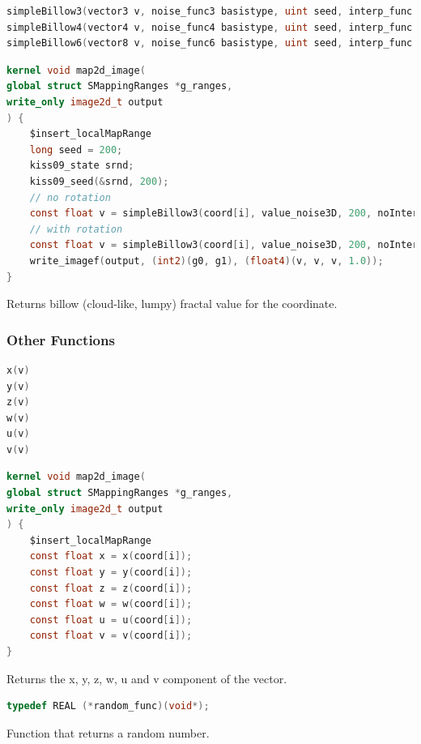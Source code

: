 \begin{lstlisting}[caption={Definition of simple billow fractal functions},label={lst:simple_billow_definition},language=OpenCL]
simpleBillow3(vector3 v, noise_func3 basistype, uint seed, interp_func interp, random_func rnd, void *srnd, uint numoctaves, REAL frequency, bool rot);
simpleBillow4(vector4 v, noise_func4 basistype, uint seed, interp_func interp, random_func rnd, void *srnd, uint numoctaves, REAL frequency, bool rot);
simpleBillow6(vector8 v, noise_func6 basistype, uint seed, interp_func interp, random_func rnd, void *srnd, uint numoctaves, REAL frequency, bool rot);
\end{lstlisting}

\begin{lstlisting}[caption={Example for simple billow fractal functions},label={lst:simple_billow_example},language=OpenCL]
kernel void map2d_image(
global struct SMappingRanges *g_ranges,
write_only image2d_t output
) {
    $insert_localMapRange
    long seed = 200;
    kiss09_state srnd;
    kiss09_seed(&srnd, 200);
    // no rotation
    const float v = simpleBillow3(coord[i], value_noise3D, 200, noInterp, random_kiss09, &srnd, 3, 0.125, false);
    // with rotation
    const float v = simpleBillow3(coord[i], value_noise3D, 200, noInterp, random_kiss09, &srnd, 3, 0.125, true);
    write_imagef(output, (int2)(g0, g1), (float4)(v, v, v, 1.0));
}
\end{lstlisting}

Returns billow (cloud-like, lumpy) fractal value for the coordinate.

\subsubsection{Other Functions}

\begin{lstlisting}[caption={Definition of components functions},label={lst:components_definition},language=OpenCL]
x(v)
y(v)
z(v)
w(v)
u(v)
v(v)
\end{lstlisting}

\begin{lstlisting}[caption={Example for components functions},label={lst:components_example},language=OpenCL]
kernel void map2d_image(
global struct SMappingRanges *g_ranges,
write_only image2d_t output
) {
    $insert_localMapRange
    const float x = x(coord[i]);
    const float y = y(coord[i]);
    const float z = z(coord[i]);
    const float w = w(coord[i]);
    const float u = u(coord[i]);
    const float v = v(coord[i]);
}
\end{lstlisting}

Returns the x, y, z, w, u and v component of the vector.

\begin{lstlisting}[caption={Definition of random function type},label={lst:random_type_definition},language=OpenCL]
typedef REAL (*random_func)(void*);
\end{lstlisting}

Function that returns a random number.
